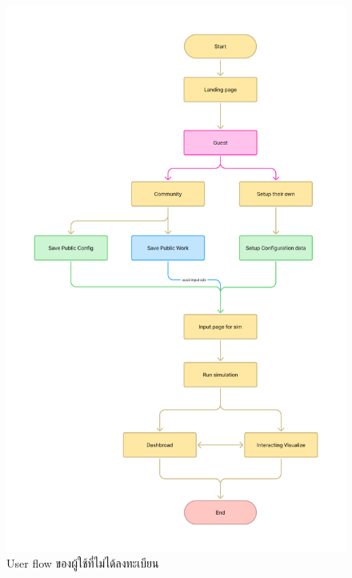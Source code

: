   \begin{figure}
    \centering
    \includegraphics[width=\textwidth,height=0.95\textheight,keepaspectratio]{User_flow_-_guest.png}
    \caption{User flow  ของผู้ใช้ที่ไม่ได้ลงทะเบียน}
    \label{fig:UserFlowUnregistered}
  \end{figure}

